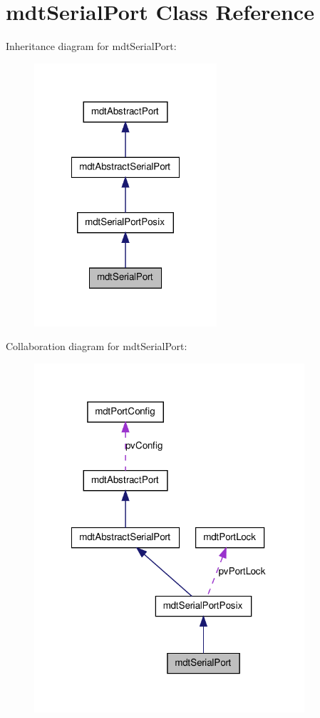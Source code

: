 \hypertarget{classmdt_serial_port}{
\section{mdtSerialPort Class Reference}
\label{classmdt_serial_port}
}


Inheritance diagram for mdtSerialPort:\nopagebreak
\begin{figure}[H]
\begin{center}
\leavevmode
\includegraphics[width=192pt]{classmdt_serial_port__inherit__graph}
\end{center}
\end{figure}


Collaboration diagram for mdtSerialPort:
\nopagebreak
\begin{figure}[H]
\begin{center}
\leavevmode
\includegraphics[width=284pt]{classmdt_serial_port__coll__graph}
\end{center}
\end{figure}
